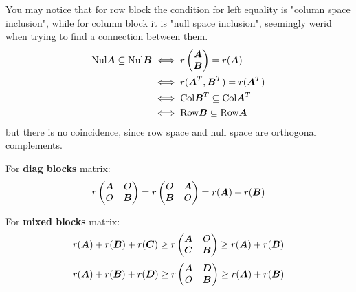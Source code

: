 \documentclass{overview}
\begin{document}
You may notice that for row block the condition for left equality is
"column space inclusion", while for column block it is "null space inclusion",
seemingly werid when trying to find a connection between them.
\[
	\begin{aligned}
		\text{Nul}\boldsymbol{A} \subseteq \text{Nul}\boldsymbol{B}
		&\iff r\begin{pmatrix} \boldsymbol{A} \\ \boldsymbol{B} \end{pmatrix} = r(\boldsymbol{A}) \\
		&\iff r(\boldsymbol{A}^T , \boldsymbol{B}^T) = r(\boldsymbol{A}^T) \\
		&\iff \text{Col}\boldsymbol{B}^T \subseteq \text{Col}\boldsymbol{A}^T \\
		&\iff \text{Row}\boldsymbol{B} \subseteq \text{Row}\boldsymbol{A}
	\end{aligned}
\] 
but there is no coincidence, since row space and null space are orthogonal complements.

For \textbf{diag blocks} matrix:
\[
	r\begin{pmatrix} \boldsymbol{A} & O \\
		O & \boldsymbol{B} \\ \end{pmatrix}
	=
	r\begin{pmatrix} O & \boldsymbol{A} \\
	\boldsymbol{B} & O \\ \end{pmatrix}
	= r(\boldsymbol{A}) + r(\boldsymbol{B})
\] 

For \textbf{mixed blocks} matrix:
\[
	r(\boldsymbol{A})+r(\boldsymbol{B})+r(\boldsymbol{C})
	\geq
	r\begin{pmatrix} \boldsymbol{A} & O \\
		\boldsymbol{C}& \boldsymbol{B} \\ \end{pmatrix}
	\geq
	r(\boldsymbol{A})+r(\boldsymbol{B})
\] 
\[
	r(\boldsymbol{A})+r(\boldsymbol{B})+r(\boldsymbol{D})
	\geq
	r\begin{pmatrix} \boldsymbol{A} & \boldsymbol{D} \\
		O & \boldsymbol{B} \\ \end{pmatrix}
	\geq
	r(\boldsymbol{A})+r(\boldsymbol{B})
\] 
\end{document}
